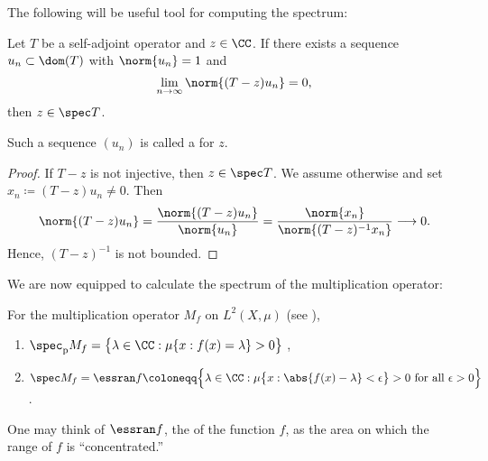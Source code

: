 \documentclass[oneside,reqno,letterpaper]{amsart}
\newcommand{\pspec}{\spec_{\mathrm{p}}}
\begin{document}
The following will be useful tool for computing the spectrum:

\begin{proposition}
\label{thm:weyl-sequence}
  Let \(T\) be a self-adjoint operator and \(z \in \CC\). 
  If there exists a sequence \({u_n} \subset \dom(T)\) with \(\norm{u_n} = 1\) and 
  \[
    \lim_{n \to \infty} \norm{(T - z) u_n} = 0 , 
  \] 
  then \(z \in \spec T\). 
\end{proposition}
Such a sequence \((u_n)\) is called a  for \(z\).
\begin{proof}
  If \(T - z\) is not injective, then \(z \in \spec T\).
  We assume otherwise and set \(x_n \coloneqq (T - z) u_n \neq 0\).
  Then
  \[
    \norm{(T - z) u_n} 
    = \frac{\norm{(T - z) u_n}}{\norm{u_n}} 
    = \frac{\norm{x_n}}{\norm{(T - z)^{-1} x_n}} 
    \longrightarrow 0 . 
  \] 
  Hence, \((T - z)^{-1}\) is not bounded. 
\end{proof}




We are now equipped to calculate the spectrum of the multiplication operator: 
\begin{proposition}
\label{thm:multiplication-operator-spectrum}
  For the multiplication operator \(M_f\) on \(L^2(X, \mu)\) (see ), 
  \begin{enumerate}[label=(\alph*)]
    \item  \(\pspec M_f = \big\{ \lambda \in \CC: \mu\{x: f(x) = \lambda\} > 0 \big\}\) ,  
    \item \(
      \spec M_f 
      = \essran f 
      \coloneqq \Big\{ 
        \lambda \in \CC: 
        \mu\big\{x:\abs{f(x) - \lambda} < \epsilon\big\} > 0 \text{ for all } \epsilon > 0
      \Big\}
      \). 
  \end{enumerate}
\end{proposition}
One may think of \(\essran f\), the  of the function \(f\), as the area on which the range of \(f\) is ``concentrated.''
\end{document}
